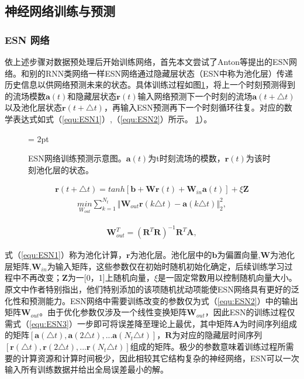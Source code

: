 \subsection{神经网络训练与预测}
\subsubsection{ESN 网络}
依上述步骤对数据预处理后开始训练网络，首先本文尝试了Anton等提出的ESN网络。和别的RNN类网络一样ESN网络通过隐藏层状态（ESN中称为池化层）传递历史信息以供网络预测未来的状态。具体训练过程如图\ref{fig:ESN_structure}，将上一个时刻预测得到的流场模数$\bm a(t)$和隐藏层状态$\bm r(t)$输入网络预测下一个时刻的流场$\bm a(t+\triangle t)$以及池化层状态$\bm r(t+\triangle t)$，再输入ESN预测再下一个时刻循环往复。对应的数学表达式如式（\ref{equ:ESN1}）,（\ref{equ:ESN2}）所示。
\ref{fig:ESN_structure}）。
\begin{figure}[H]
	\subfigbottomskip = 2pt
	\begin{minipage}[h]{\linewidth}
	\centering
	\end{minipage}
	\quad
	\caption{ESN网络训练预测示意图。$\bm a(t)$为t时刻流场的模数，$\bm r(t)$为该时刻池化层的状态。}
\label{fig:ESN_structure}
\end{figure}

\begin{equation}\label{equ:ESN1}
\begin{aligned}
\bm r(t+\triangle t) = tanh[\bm b + \bm W\bm r(t) + \bm W_{in}\bm a(t)] + \xi \bm Z
\end{aligned}
\end{equation}
\begin{equation}\label{equ:ESN2}
\begin{aligned}
\underset{W_{out}}{min} \sum_{k=1}^{N_t} \Vert \bm W_{out} \bm r(k\triangle t) -\bm a(k\triangle t) \Vert^{2}_{2},
\end{aligned}
\end{equation}

\begin{equation}
\begin{aligned}
\bm W^{T}_{out} = (\bm R^{T} \bm R)^{-1}\bm R^{T}\bm A,
\end{aligned}\label{equ:ESN3}
\end{equation}

式（\ref{equ:ESN1}）称为池化计算，$\bm r$为池化层。池化层中的$\bm b$为偏置向量,$\bm W$为池化层矩阵,$\bm W_{in}$为输入矩阵，这些参数仅在初始时随机初始化确定，后续训练学习过程中不再改变；$\bm Z$为一[0，1]上随机向量，$\xi$是一固定常数用以控制随机向量大小。原文中作者特别指出，他们特别添加的该项随机扰动项能使ESN网络具有更好的泛化性和预测能力。ESN网络中需要训练改变的参数仅为式（\ref{equ:ESN2}）中的输出矩阵$\bm W_{out}$。由于优化参数仅涉及一个线性变换矩阵$\bm W_{out}$，因此ESN的训练过程仅需式（\ref{equ:ESN3}）一步即可将误差降至理论上最优，其中矩阵$\bm A$为时间序列组成的矩阵$[\bm a(\triangle t),\bm a(2\triangle t), ...\bm a(N_{t}\triangle t)]$，$\bm R$为对应的隐藏层时间序列$[\bm r(\triangle t),\bm r(2\triangle t), ...\bm r(N_{t}\triangle t)]$组成的矩阵。极少的参数意味着训练过程所需要的计算资源和计算时间极少，因此相较其它结构复杂的神经网络，ESN可以一次输入所有训练数据并给出全局误差最小的解。

